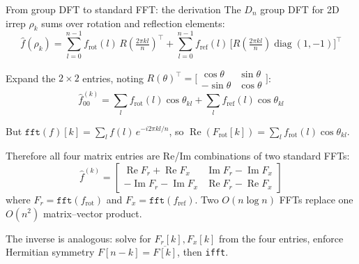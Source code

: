 \documentclass[aspectratio=169]{beamer}
\begin{document}
\begin{frame}{From group DFT to standard FFT: the derivation}
  The $D_n$ group DFT for 2D irrep $\rho_k$ sums over rotation and reflection elements:
  \[
    \hat{f}(\rho_k) = \sum_{l=0}^{n-1} f_{\text{rot}}(l)\, R\!\left(\tfrac{2\pi kl}{n}\right)^{\!\top}
    + \sum_{l=0}^{n-1} f_{\text{ref}}(l)\, \bigl[R\!\left(\tfrac{2\pi kl}{n}\right) \operatorname{diag}(1,-1)\bigr]^{\!\top}
  \]

  Expand the $2\times 2$ entries, noting $R(\theta)^\top = \bigl[\begin{smallmatrix}\cos\theta & \sin\theta \\ -\sin\theta & \cos\theta\end{smallmatrix}\bigr]$:
  \[
    \hat{f}_{00}^{(k)} = \textstyle\sum_l f_{\text{rot}}(l)\cos\theta_{kl} + \sum_l f_{\text{ref}}(l)\cos\theta_{kl}
  \]

  But $\texttt{fft}(f)[k] = \sum_l f(l)\, e^{-i 2\pi kl/n}$, so
  $\operatorname{Re}(F_{\text{rot}}[k]) = \sum_l f_{\text{rot}}(l) \cos\theta_{kl}$.

  \smallskip

  Therefore all four matrix entries are Re/Im combinations of two standard FFTs:
  \[
    \hat{f}^{(k)} = \begin{bmatrix}
      \operatorname{Re}F_r + \operatorname{Re}F_x & \operatorname{Im}F_r - \operatorname{Im}F_x \\
      -\operatorname{Im}F_r - \operatorname{Im}F_x & \operatorname{Re}F_r - \operatorname{Re}F_x
    \end{bmatrix}
  \]
  where $F_r = \texttt{fft}(f_{\text{rot}})$ and $F_x = \texttt{fft}(f_{\text{ref}})$.
  Two $O(n\log n)$ FFTs replace one $O(n^2)$ matrix--vector product.

  \smallskip

  The inverse is analogous: solve for $F_r[k], F_x[k]$ from the four entries,
  enforce Hermitian symmetry $F[n{-}k] = \overline{F[k]}$, then \texttt{ifft}.
\end{frame}
\end{document}
